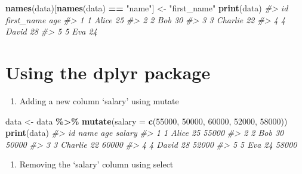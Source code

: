 \documentclass[
]{book}
\newenvironment{Shaded}{\begin{snugshade}}{\end{snugshade}}
\newcommand{\AttributeTok}[1]{\textcolor[rgb]{0.13,0.29,0.53}{#1}}
\newcommand{\CommentTok}[1]{\textcolor[rgb]{0.56,0.35,0.01}{\textit{#1}}}
\newcommand{\DecValTok}[1]{\textcolor[rgb]{0.00,0.00,0.81}{#1}}
\newcommand{\FunctionTok}[1]{\textcolor[rgb]{0.13,0.29,0.53}{\textbf{#1}}}
\newcommand{\NormalTok}[1]{#1}
\newcommand{\OtherTok}[1]{\textcolor[rgb]{0.56,0.35,0.01}{#1}}
\newcommand{\SpecialCharTok}[1]{\textcolor[rgb]{0.81,0.36,0.00}{\textbf{#1}}}
\newcommand{\StringTok}[1]{\textcolor[rgb]{0.31,0.60,0.02}{#1}}
\providecommand{\tightlist}{%
  \setlength{\itemsep}{0pt}\setlength{\parskip}{0pt}}
\begin{document}
\begin{Shaded}
\begin{Highlighting}[]
\FunctionTok{names}\NormalTok{(data)[}\FunctionTok{names}\NormalTok{(data) }\SpecialCharTok{==} \StringTok{"name"}\NormalTok{] }\OtherTok{\textless{}{-}} \StringTok{"first\_name"}
\FunctionTok{print}\NormalTok{(data)}
\CommentTok{\#\textgreater{}   id first\_name age}
\CommentTok{\#\textgreater{} 1  1      Alice  25}
\CommentTok{\#\textgreater{} 2  2        Bob  30}
\CommentTok{\#\textgreater{} 3  3    Charlie  22}
\CommentTok{\#\textgreater{} 4  4      David  28}
\CommentTok{\#\textgreater{} 5  5        Eva  24}
\end{Highlighting}
\end{Shaded}

\section*{Using the dplyr package}\label{using-the-dplyr-package-1}

\begin{enumerate}
\def\labelenumi{\arabic{enumi}.}
\tightlist
\item
  Adding a new column `salary' using mutate
\end{enumerate}

\begin{Shaded}
\begin{Highlighting}[]
\NormalTok{data }\OtherTok{\textless{}{-}}\NormalTok{ data }\SpecialCharTok{\%\textgreater{}\%}
  \FunctionTok{mutate}\NormalTok{(}\AttributeTok{salary =} \FunctionTok{c}\NormalTok{(}\DecValTok{55000}\NormalTok{, }\DecValTok{50000}\NormalTok{, }\DecValTok{60000}\NormalTok{, }\DecValTok{52000}\NormalTok{, }\DecValTok{58000}\NormalTok{))}
\FunctionTok{print}\NormalTok{(data)}
\CommentTok{\#\textgreater{}   id    name age salary}
\CommentTok{\#\textgreater{} 1  1   Alice  25  55000}
\CommentTok{\#\textgreater{} 2  2     Bob  30  50000}
\CommentTok{\#\textgreater{} 3  3 Charlie  22  60000}
\CommentTok{\#\textgreater{} 4  4   David  28  52000}
\CommentTok{\#\textgreater{} 5  5     Eva  24  58000}
\end{Highlighting}
\end{Shaded}

\begin{enumerate}
\def\labelenumi{\arabic{enumi}.}
\setcounter{enumi}{1}
\tightlist
\item
  Removing the `salary' column using select
\end{enumerate}
\end{document}
